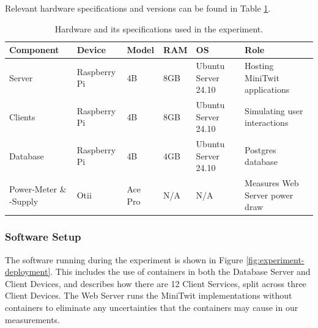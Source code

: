 \documentclass[main.tex]{subfiles}
\begin{document}
Relevant hardware specifications and versions can be found in Table \ref{table:hardware-setup}.

\begin{table}[]
\renewcommand{\arraystretch}{1.5}
\begin{tabular}{|llllll|}
\hline
\rowcolor[HTML]{EFEFEF} 
\textbf{Component}     & \textbf{Device} & \textbf{Model} & \textbf{RAM} & \textbf{OS}         & \textbf{Role}                  \\ \hline
Server                 & Raspberry Pi    & 4B             & 8GB          & Ubuntu Server 24.10 & Hosting MiniTwit applications  \\
\rowcolor[HTML]{EFEFEF} 
Clients                & Raspberry Pi    & 4B             & 8GB          & Ubuntu Server 24.10 & Simulating user interactions   \\
Database               & Raspberry Pi    & 4B             & 4GB          & Ubuntu Server 24.10 & Postgres database              \\
\rowcolor[HTML]{EFEFEF} 
Power-Meter \& -Supply & Otii            & Ace Pro        & N/A          & N/A                 & Measures Web Server power draw \\ \hline
\end{tabular}
\caption{Hardware and its specifications used in the experiment.}
\label{table:hardware-setup}
\end{table}

\subsubsection{Software Setup}
The software running during the experiment is shown in Figure \ref{fig:experiment-deployment}. This includes the use of containers in both the Database Server and Client Devices, and describes how there are 12 Client Services, split across three Client Devices. The Web Server runs the MiniTwit implementations without containers to eliminate any uncertainties that the containers may cause in our measurements.
\end{document}
